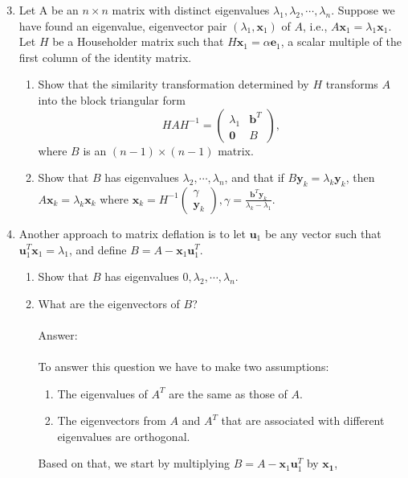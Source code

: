 \documentclass{article}
\renewcommand{\vec}[1]{\mathbf{#1}}
\begin{document}
\begin{enumerate}
\setcounter{enumi}{2}
\item Let A be an $n \times n$ matrix with distinct eigenvalues $\lambda_1, \lambda_2, \cdots, \lambda_n$.
Suppose we have found an eigenvalue, eigenvector pair $(\lambda_1,\vec{x}_1)$ of $A$, i.e., $A \vec{x}_1 = \lambda_1 \vec{x}_1$.  Let $H$ be a Householder matrix such that $H\vec{x}_1 =
\alpha \vec{e}_1$, a scalar multiple of the first column of the identity  matrix.  
\begin{enumerate}
\item Show that the similarity transformation determined by $H$ transforms $A$ into the block triangular form 
$$
H A H^{-1} = \begin{pmatrix} \lambda_1 & \vec{b}^T \\ \vec{0} & B \end{pmatrix},
$$
where $B$ is an $(n-1) \times (n-1)$ matrix.
\item Show that $B$ has eigenvalues $\lambda_2, \cdots, \lambda_n$, and that if $B\vec{y}_k = \lambda_k \vec{y}_k$, then $A \vec{x}_k = \lambda_k \vec{x}_k$ where $\vec{x}_k =
  H^{-1} \begin{pmatrix} \gamma \\ \vec{y}_k \end{pmatrix}, \gamma = \frac{\vec{b}^T\vec{y}_k}{\lambda_k-\lambda_1}.$
\end{enumerate}
\item Another approach to matrix deflation is to let $\vec{u}_1$ be any vector such that $\vec{u}_1^T\vec{x}_1 = \lambda_1$, and define $B = A - \vec{x}_1\vec{u}_1^T$.
\begin{enumerate}
\item Show that $B$ has eigenvalues $0, \lambda_2, \cdots, \lambda_n$.
\item What are the eigenvectors of $B$?
\\
\\
Answer:\\
\\
To answer this question we have to make two assumptions:
\begin{enumerate}
 \item The eigenvalues of $A^T$ are the same as those of $A$.
 \item The eigenvectors from $A$ and $A^T$ that are associated with different eigenvalues are orthogonal.
\end{enumerate}
Based on that, we start by multiplying $B = A - \vec{x}_1\vec{u}_1^T$ by $\vec{x_1}$,


\end{enumerate}
\end{enumerate}
\end{document}
